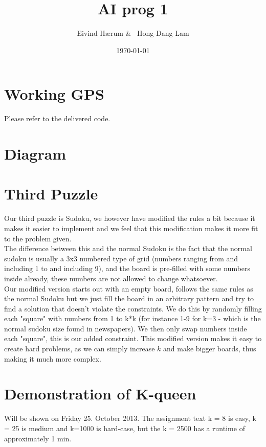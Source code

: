 \documentclass[12pt, a4paper]{article}
\title{AI prog 1}
\author{Eivind Hærum \& \ Hong-Dang Lam}
\date{\today} %
\begin{document}
\maketitle
% 
% 
 
\newpage
\tableofcontents
\newpage
 
\section{Working GPS}
Please refer to the delivered code.

\section{Diagram}

\section{Third Puzzle}
Our third puzzle is Sudoku, we however have modified the rules a bit because it makes it easier to implement and we feel that this modification makes it more fit to the problem given.\\
The difference between this and the normal Sudoku is the fact that the normal sudoku is usually a 3x3 numbered type of grid (numbers ranging from and including 1 to and including 9), and the board is pre-filled with some numbers inside already, these numbers are not allowed to change whatsoever.\\
Our modified version starts out with an empty board, follows the same rules as the normal Sudoku but we just fill the board in an arbitrary pattern and try to find a solution that doesn't violate the constraints. We do this by randomly filling each "square" with numbers from 1 to k*k (for instance 1-9 for k=3 - which is the normal sudoku size found in newspapers). We then only swap numbers inside each "square", this is our added constraint. This modified version makes it easy to create hard problems, as we can simply increase $k$ and make bigger boards, thus making it much more complex.

\section{Demonstration of K-queen}
Will be shown on Friday 25. October 2013.
The assignment text  k = 8 is easy, k = 25 is medium and k=1000 is hard-case, but the k = 2500 has a runtime of approximately 1 min.
\end{document}
